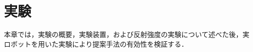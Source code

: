 \chapter{実験}

  本章では，実験の概要，実験装置，および反射強度の実験について述べた後，実ロボットを用いた実験により提案手法の有効性を検証する．

\label{chap:experiments}
%





%
